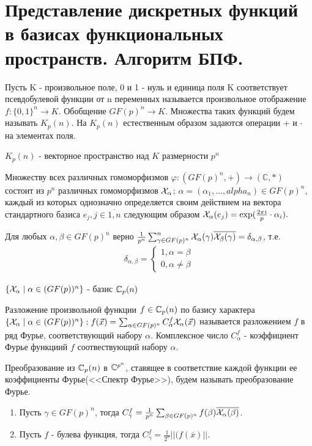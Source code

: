 \section {Представление дискретных функций в базисах функциональных пространств. Алгоритм БПФ. }

\opr Пусть K - произвольное поле, 0 и 1 - нуль и единица поля K  соответствует псевдобулевой функции от n переменных называется произвольное отображение $f:\{0,1\}^{n} \longrightarrow K$.
Обобщение $ GF(p)^n \longrightarrow K$.
Множества таких функций будем называть $K_p(n)$. На $K_p(n)$ естественным образом задаются операции + и $\cdot$ на элементах поля.

\utv $K_p(n)$ - векторное пространство над $K$ размерности $p^n$

\thr Множеству всех различных гомоморфизмов $\varphi: (GF(p)^n,+) \longrightarrow (\mathbb{C},*)$ состоит из $p^n$ различных гомоморфизмов $\mathcal{X}_\alpha$; $\alpha = (\alpha_1,\dots, alpha_n) \in GF(p)^n$, каждый из которых однозначно определяется своим действием на вектора стандартного базиса $e_j, j \in \overline{1, n}$
следующим образом $\mathcal{X}_\alpha(e_j) = \exp(\frac{2\pi i}{p}\cdot \alpha_i).$

\utv Для любых $\alpha,\beta \in GF(p)^n$ верно $\frac{1}{p^n}\sum_{\gamma \in GF(p)^n}^n \mathcal{X}_\alpha (\gamma) \overline {\mathcal{X}_\beta (\gamma )} = \delta_{\alpha,\beta}$, т.е.
\begin{align*}
    \delta_{\alpha, \beta} = 
    \begin{cases}
        1, \alpha = \beta \\
        0, \alpha \neq \beta
    \end{cases}
\end{align*}

\thr $\{ \mathcal{X}_\alpha \mid \alpha \in (GF(p))^n \}$ - базис $\mathbb{C}_p(n)$

\opr Разложение произвольной функции $f \in \mathbb{C}_p(n)$ по базису характера $\{ \mathcal{X}_\alpha \mid \alpha \in (GF(p))^n \}: f(\vec{x}) =  \sum_{\alpha \in GF(p)^n} C_\alpha^f \mathcal{X}_\alpha(\vec{x})$ называется разложением $f$ в ряд Фурье, соответствующий набору $\alpha$. Комплексное число $C_\alpha^f$ - коэффициент Фурье функциий $f$
соотвествующий набору $\alpha$.

\opr Преобразование из $\mathbb{C}_p(n)$ в $\mathbb{C}^{p^n}$, ставящее в соответствие каждой функции ее коэффициенты Фурье(<<Спектр Фурье>>), будем называть преобразование Фурье.

\utv
\begin{enumerate}
    \item Пусть $\gamma \in GF(p)^n$, тогда $C_\gamma^f = \frac{1}{p^n}\sum_{\beta \in GF(p)^n} f(\beta) \overline{\mathcal{X}_\alpha(\beta)}$.
    \item Пусть $f$ - булева функция, тогда $C_\gamma^f = \frac{1}{2^n}||(f(\overline{x})||$.
\end{enumerate}

